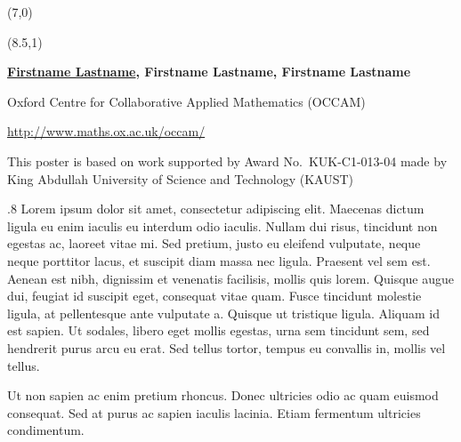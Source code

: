 \documentclass[a0]{a0poster}
\begin{document}
\background
{
\logos

\selectfont

\frameoff
\begin{textblock}{17}(7,0)
\end{textblock}

\frameoff
\begin{textblock}{14}(8.5,1)
\begin{center}
\vspace{-1.4cm}
{\bfseries\Large \underline{Firstname Lastname}, Firstname Lastname,  Firstname Lastname} 

Oxford Centre for Collaborative Applied Mathematics (OCCAM)

\url{http://www.maths.ox.ac.uk/occam/}

\smallskip

This poster is based on work supported by Award No.\ KUK-C1-013-04 made by\\
King Abdullah University of Science and Technology (KAUST)
\end{center}
\end{textblock}
}


\sffamily
\TPMargin{10pt}

\framethin
\begin{area1}{.8}
Lorem ipsum dolor sit amet, consectetur adipiscing elit. Maecenas dictum ligula eu enim iaculis eu interdum odio iaculis. Nullam dui risus, tincidunt non egestas ac, laoreet vitae mi. Sed pretium, justo eu eleifend vulputate, neque neque porttitor lacus, et suscipit diam massa nec ligula. Praesent vel sem est. Aenean est nibh, dignissim et venenatis facilisis, mollis quis lorem. Quisque augue dui, feugiat id suscipit eget, consequat vitae quam. Fusce tincidunt molestie ligula, at pellentesque ante vulputate a. Quisque ut tristique ligula. Aliquam id est sapien. Ut sodales, libero eget mollis egestas, urna sem tincidunt sem, sed hendrerit purus arcu eu erat. Sed tellus tortor, tempus eu convallis in, mollis vel tellus.

Ut non sapien ac enim pretium rhoncus. Donec ultricies odio ac quam euismod consequat. Sed at purus ac sapien iaculis lacinia. Etiam fermentum ultricies condimentum.
\end{area1}
\end{document}
